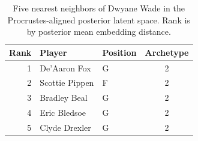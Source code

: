 \begin{table}[htbp]
  \centering\small
  \begin{tabular}{rllc}
    \toprule
    Rank & Player & Position & Archetype \\
    \midrule
    1 & De'Aaron Fox & G & 2 \\
    2 & Scottie Pippen & F & 2 \\
    3 & Bradley Beal & G & 2 \\
    4 & Eric Bledsoe & G & 2 \\
    5 & Clyde Drexler & G & 2 \\
    \bottomrule
  \end{tabular}
  \caption{Five nearest neighbors of Dwyane Wade in the Procrustes-aligned posterior latent space. Rank is by posterior mean embedding distance.}
  \label{tab:Dwyane_Wade_neighbors}
\end{table}

